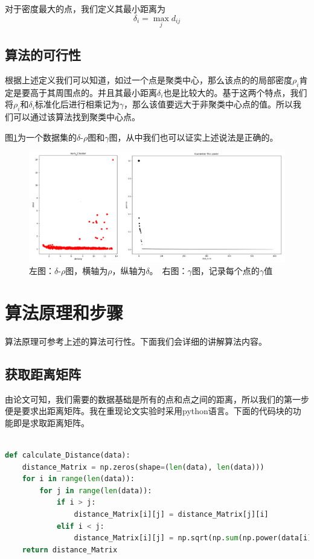 对于密度最大的点，我们定义其最小距离为
$$ \delta_i = \max_{j}{d_{ij}} $$

\subsection{算法的可行性}
根据上述定义我们可以知道，如过一个点是聚类中心，那么该点的的局部密度$\rho_i$肯定是要高于其周围点的。并且其最小距离$\delta_i$也是比较大的。基于这两个特点，我们将$\rho_i$和$\delta_i$标准化后进行相乘记为$\gamma$，那么该值要远大于非聚类中心点的值。所以我们可以通过该算法找到聚类中心点。

图\ref{Figure_1}为一个数据集的$\delta$-$\rho$图和$\gamma$图，从中我们也可以证实上述说法是正确的。

\begin{figure}[ht]
\centering
\includegraphics[scale=0.38]{figure/Figure_1.png}%
\caption{左图：$\delta$-$\rho$图，横轴为$\rho$，纵轴为$\delta$。\ 右图：$\gamma$图，记录每个点的$\gamma$值}
\label{Figure_1}
\end{figure}

\section{算法原理和步骤}
算法原理可参考上述的算法可行性。下面我们会详细的讲解算法内容。
\subsection{获取距离矩阵}
由论文可知，我们需要的数据基础是所有的点和点之间的距离，所以我们的第一步便是要求出距离矩阵。我在重现论文实验时采用python语言。下面的代码块的功能即是求取距离矩阵。
\begin{lstlisting}[language=python]

def calculate_Distance(data):
    distance_Matrix = np.zeros(shape=(len(data), len(data)))
    for i in range(len(data)):
        for j in range(len(data)):
            if i > j:
                distance_Matrix[i][j] = distance_Matrix[j][i]
            elif i < j:
                distance_Matrix[i][j] = np.sqrt(np.sum(np.power(data[i] - data[j], 2)))
    return distance_Matrix
\end{lstlisting}



